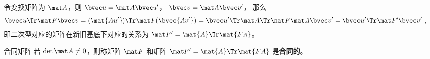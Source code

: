 令变换矩阵为 $\mat A$，则 $\bvec u = \mat A \bvec u'$， $\bvec v = \mat A \bvec v'$， 那么
\begin{equation}
\bvec u\Tr \mat F \bvec v = (\mat {Au'})\Tr \mat F (\bvec {Av'}) = {\bvec u'}\Tr \mat A\Tr\mat F \mat A \bvec v'={\bvec u'}\Tr \mat F' \bvec v'~,
\end{equation}
即二次型对应的矩阵在新旧基底下对应的关系为 $\mat F'=\mat{A}\Tr \mat{FA}$。
\begin{definition}{合同矩阵}
若 $\det \mat A\neq 0$，则称矩阵 $\mat F$ 和矩阵 $\mat F'=\mat{A}\Tr \mat{FA}$ 是\textbf{合同的}。
\end{definition}
